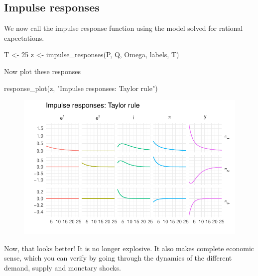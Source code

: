 \documentclass[
  letterpaper,
]{book}
\newenvironment{Shaded}{\begin{snugshade}}{\end{snugshade}}
\newcommand{\DecValTok}[1]{\textcolor[rgb]{0.68,0.00,0.00}{#1}}
\newcommand{\FunctionTok}[1]{\textcolor[rgb]{0.28,0.35,0.67}{#1}}
\newcommand{\NormalTok}[1]{\textcolor[rgb]{0.00,0.23,0.31}{#1}}
\newcommand{\OtherTok}[1]{\textcolor[rgb]{0.00,0.23,0.31}{#1}}
\newcommand{\StringTok}[1]{\textcolor[rgb]{0.13,0.47,0.30}{#1}}
\begin{document}
\hypertarget{impulse-responses}{%
\subsection{Impulse responses}\label{impulse-responses}}

We now call the impulse response function using the model solved for
rational expectations.

\begin{Shaded}
\begin{Highlighting}[]
\NormalTok{T }\OtherTok{\textless{}{-}} \DecValTok{25}
\NormalTok{z }\OtherTok{\textless{}{-}} \FunctionTok{impulse\_responses}\NormalTok{(P, Q, Omega, labels, T)}
\end{Highlighting}
\end{Shaded}

Now plot these responses

\begin{Shaded}
\begin{Highlighting}[]
\FunctionTok{response\_plot}\NormalTok{(z, }\StringTok{"Impulse responses: Taylor rule"}\NormalTok{)}
\end{Highlighting}
\end{Shaded}

\begin{figure}[H]

{\centering \includegraphics{./BK_files/figure-pdf/unnamed-chunk-13-1.pdf}

}

\end{figure}

Now, that looks better! It is no longer explosive. It also makes
complete economic sense, which you can verify by going through the
dynamics of the different demand, supply and monetary shocks.
\end{document}
